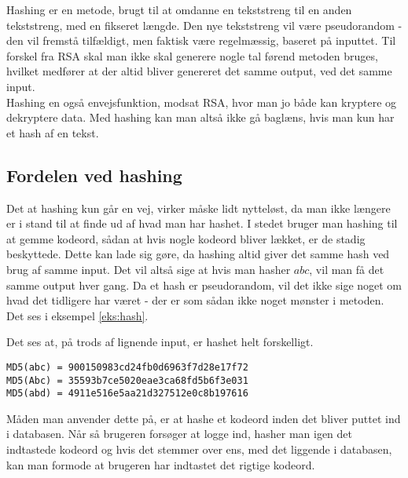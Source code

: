 Hashing er en metode, brugt til at omdanne en tekststreng til en anden tekststreng, med en fikseret længde.
Den nye tekststreng vil være pseudorandom - den vil fremstå tilfældigt, men faktisk være regelmæssig, baseret på inputtet.
Til forskel fra RSA skal man ikke skal generere nogle tal førend metoden bruges, hvilket medfører at der altid bliver genereret det samme output, ved det samme input.
\\
Hashing en også envejsfunktion, modsat RSA, hvor man jo både kan kryptere og dekryptere data.
Med hashing kan man altså ikke gå baglæns, hvis man kun har et hash af en tekst.


    \subsection{Fordelen ved hashing}
    Det at hashing kun går en vej, virker måske lidt nytteløst, da man ikke længere er i stand til at finde ud af hvad man har hashet.
    I stedet bruger man hashing til at gemme kodeord, sådan at hvis nogle kodeord bliver lækket, er de stadig beskyttede.
    Dette kan lade sig gøre, da hashing altid giver det samme hash ved brug af samme input.
    Det vil altså sige at hvis man hasher \(abc\), vil man få det samme output hver gang.
    Da et hash er pseudorandom, vil det ikke sige noget om hvad det tidligere har været - der er som sådan ikke noget mønster i metoden.
    Det ses i eksempel \ref{eks:hash}.


    \begin{eks}
        Det ses at, på trods af lignende input, er hashet helt forskelligt.
        \begin{center}
            \texttt{MD5(abc) = 900150983cd24fb0d6963f7d28e17f72}\\
            \texttt{MD5(Abc) = 35593b7ce5020eae3ca68fd5b6f3e031}\\
            \texttt{MD5(abd) = 4911e516e5aa21d327512e0c8b197616}\\
        \end{center}
        \label{eks:hash}

    \end{eks}

    \noindent
    Måden man anvender dette på, er at hashe et kodeord inden det bliver puttet ind i databasen.
    Når så brugeren forsøger at logge ind, hasher man igen det indtastede kodeord og hvis det stemmer over ens, med det liggende i databasen, kan man formode at brugeren har indtastet det rigtige kodeord.
    \\

